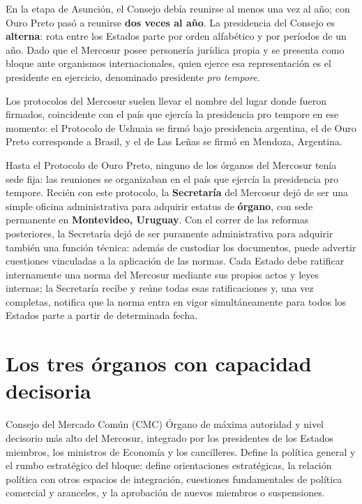 \documentclass[12pt,oneside]{book}
\begin{document}
En la etapa de Asunción, el Consejo debía reunirse al menos una vez al año; con Ouro Preto pasó a reunirse \textbf{dos veces al año}. La presidencia del Consejo es \textbf{alterna}: rota entre los Estados parte por orden alfabético y por períodos de un año. Dado que el Mercosur posee personería jurídica propia y se presenta como bloque ante organismos internacionales, quien ejerce esa representación es el presidente en ejercicio, denominado presidente \emph{pro tempore}.

\begin{nota}
Los protocolos del Mercosur suelen llevar el nombre del lugar donde fueron firmados, coincidente con el país que ejercía la presidencia pro tempore en ese momento: el Protocolo de Ushuaia se firmó bajo presidencia argentina, el de Ouro Preto corresponde a Brasil, y el de Las Leñas se firmó en Mendoza, Argentina.
\end{nota}

Hasta el Protocolo de Ouro Preto, ninguno de los órganos del Mercosur tenía sede fija: las reuniones se organizaban en el país que ejercía la presidencia pro tempore. Recién con este protocolo, la \textbf{Secretaría} del Mercosur dejó de ser una simple oficina administrativa para adquirir estatus de \textbf{órgano}, con sede permanente en \textbf{Montevideo, Uruguay}. Con el correr de las reformas posteriores, la Secretaría dejó de ser puramente administrativa para adquirir también una función técnica: además de custodiar los documentos, puede advertir cuestiones vinculadas a la aplicación de las normas. Cada Estado debe ratificar internamente una norma del Mercosur mediante sus propios actos y leyes internas; la Secretaría recibe y reúne todas esas ratificaciones y, una vez completas, notifica que la norma entra en vigor simultáneamente para todos los Estados parte a partir de determinada fecha.

\section{Los tres órganos con capacidad decisoria}

\begin{definicion}{Consejo del Mercado Común (CMC)}
Órgano de máxima autoridad y nivel decisorio más alto del Mercosur, integrado por los presidentes de los Estados miembros, los ministros de Economía y los cancilleres. Define la política general y el rumbo estratégico del bloque: define orientaciones estratégicas, la relación política con otros espacios de integración, cuestiones fundamentales de política comercial y aranceles, y la aprobación de nuevos miembros o suspensiones.
\end{definicion}
\end{document}
